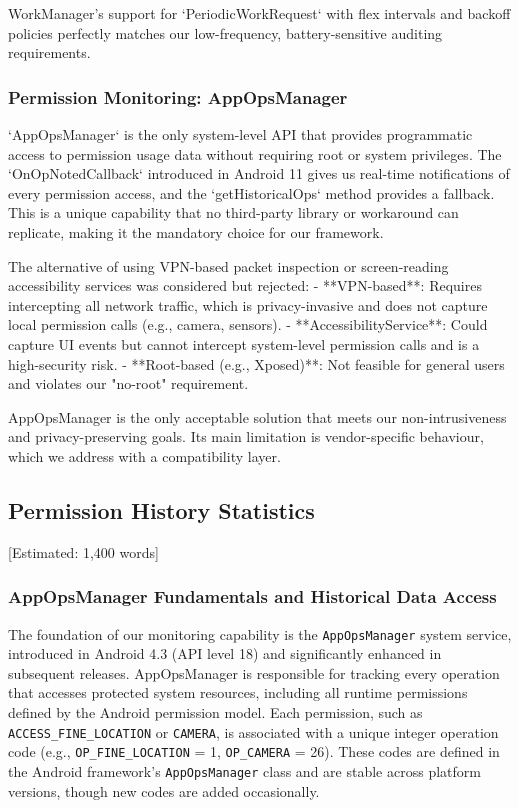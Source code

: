 WorkManager's support for `PeriodicWorkRequest` with flex intervals and backoff policies perfectly matches our low-frequency, battery-sensitive auditing requirements.

\subsubsection{Permission Monitoring: AppOpsManager}

`AppOpsManager` is the only system-level API that provides programmatic access to permission usage data without requiring root or system privileges. The `OnOpNotedCallback` introduced in Android 11 gives us real-time notifications of every permission access, and the `getHistoricalOps` method provides a fallback. This is a unique capability that no third-party library or workaround can replicate, making it the mandatory choice for our framework.

The alternative of using VPN-based packet inspection or screen-reading accessibility services was considered but rejected:
- **VPN-based**: Requires intercepting all network traffic, which is privacy-invasive and does not capture local permission calls (e.g., camera, sensors).
- **AccessibilityService**: Could capture UI events but cannot intercept system-level permission calls and is a high-security risk.
- **Root-based (e.g., Xposed)**: Not feasible for general users and violates our "no-root" requirement.

AppOpsManager is the only acceptable solution that meets our non-intrusiveness and privacy-preserving goals. Its main limitation is vendor-specific behaviour, which we address with a compatibility layer.

\subsection{Permission History Statistics} [Estimated: 1,400 words]

\subsubsection{AppOpsManager Fundamentals and Historical Data Access}

The foundation of our monitoring capability is the \texttt{AppOpsManager} system service, introduced in Android 4.3 (API level 18) and significantly enhanced in subsequent releases. AppOpsManager is responsible for tracking every operation that accesses protected system resources, including all runtime permissions defined by the Android permission model. Each permission, such as \texttt{ACCESS\_FINE\_LOCATION} or \texttt{CAMERA}, is associated with a unique integer operation code (e.g., \texttt{OP\_FINE\_LOCATION} = 1, \texttt{OP\_CAMERA} = 26). These codes are defined in the Android framework's \texttt{AppOpsManager} class and are stable across platform versions, though new codes are added occasionally.

